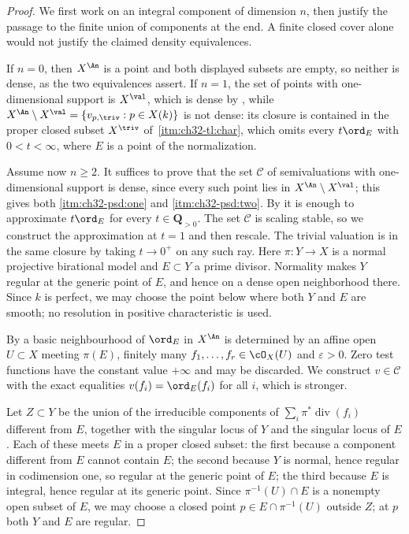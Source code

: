 \begin{proof}
We first work on an integral component of dimension $n$, then justify
the passage to the finite union of components at the end.  A finite
closed cover alone would not justify the claimed density equivalences.

If $n=0$, then $X^{\An}$ is a point and both displayed subsets are empty,
so neither is dense, as the two equivalences assert.  If $n=1$, the set of
points with one-dimensional support is $X^{\val}$, which is dense
by , while
$X^{\An}\setminus X^{\val}=\{v_{p,\triv}:p\in X(k)\}$ is not dense: its
closure is contained in the proper closed subset $X^{\triv}$ of
\,\cref{itm:ch32-tl:char}, which omits every
$t\ord_E$ with $0<t<\infty$, where $E$ is a point of the normalization.

Assume now $n\geq2$.  It suffices to prove that the set $\mathcal C$ of
semivaluations with one-dimensional support is dense, since every such point
lies in $X^{\An}\setminus X^{\val}$; this gives both
\cref{itm:ch32-psd:one} and \cref{itm:ch32-psd:two}.  By
 it is enough to approximate $t\ord_E$ for every $t\in\mathbf Q_{>0}$.
The set $\mathcal C$ is scaling stable, so we construct the approximation
at $t=1$ and then rescale.  The trivial valuation is in the same closure
by taking $t\to0^+$ on any such ray.  Here
$\pi:Y\to X$ is a normal projective birational model and $E\subset Y$ a
prime divisor.  Normality makes $Y$ regular at the generic point of $E$, and hence
on a dense open neighborhood there.  Since $k$ is perfect, we may choose
the point below where both $Y$ and $E$ are smooth; no resolution in
positive characteristic is used.

By  a basic neighbourhood of $\ord_E$ in
$X^{\An}$ is determined by an affine open $U\subset X$ meeting
$\pi(E)$, finitely many $f_1,\ldots,f_r\in\cO_X(U)$ and
$\varepsilon>0$.  Zero test functions have the constant value
$+\infty$ and may be discarded.  We construct $v\in\mathcal C$ with the exact equalities
$v(f_i)=\ord_E(f_i)$ for all $i$, which is stronger.

Let $Z\subset Y$ be the union of the irreducible components of
$\sum_i\pi^*\operatorname{div}(f_i)$ different from $E$, together with
the singular locus of $Y$ and the singular locus of $E$.  Each of these
meets $E$ in a proper closed subset: the first because a component
different from $E$ cannot contain $E$; the second because $Y$ is
normal, hence regular in codimension one, so regular at the generic point of
$E$; the third because $E$ is integral, hence regular at its generic
point.  Since $\pi^{-1}(U)\cap E$ is a nonempty open subset of $E$, we
may choose a closed point $p\in E\cap\pi^{-1}(U)$ outside $Z$; at $p$
both $Y$ and $E$ are regular.


\end{proof}
